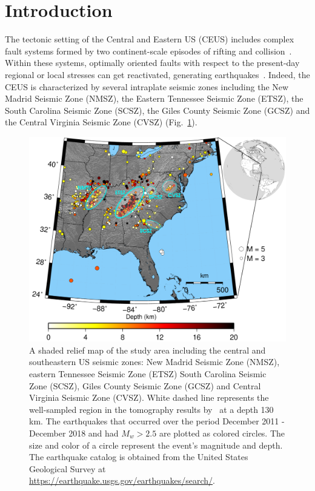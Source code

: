 \documentclass[draft,linenumbers]{agujournal2018}
\begin{document}
\section{Introduction}
     
    The tectonic setting of the Central and Eastern US (CEUS) includes complex fault systems formed by two continent-scale episodes of rifting and collision~\citep[e.g.,][]{keller1983role, hoffman1989precambrian, thomas2006tectonic}. Within these systems, optimally oriented faults with respect to the present-day regional or local stresses can get reactivated, generating earthquakes~\citep[e.g.,][]{zoback1992stress, hurd2012intraplate}. Indeed, the CEUS is characterized by several intraplate seismic zones including the New Madrid Seismic Zone (NMSZ), the Eastern Tennessee Seismic Zone (ETSZ), the South Carolina Seismic Zone (SCSZ), the Giles County Seismic Zone (GCSZ) and the Central Virginia Seismic Zone (CVSZ) (Fig.~\ref{figone}). 
    
\begin{figure}[ht]
    \centering
    \includegraphics[width=32pc]{figures/seismicity_new.png}
    \caption{ A shaded relief map of the study area including the central and southeastern US seismic zones: New Madrid Seismic Zone (NMSZ), eastern Tennessee  Seismic Zone (ETSZ) South Carolina Seismic Zone (SCSZ), Giles County Seismic Zone (GCSZ) and Central Virginia Seismic Zone (CVSZ). White dashed line represents the well-sampled region in the tomography results by~\citet{Biryol_2016} at a depth 130 km. The earthquakes that occurred over the period December 2011 - December 2018 and had $M_{w} > 2.5$ are plotted as colored circles. The size and color of a circle represent the event's magnitude and depth. The earthquake catalog is obtained from the United States Geological Survey at \url{https://earthquake.usgs.gov/earthquakes/search/}.}
    \label{figone}
 \end{figure}
    
\end{document}
